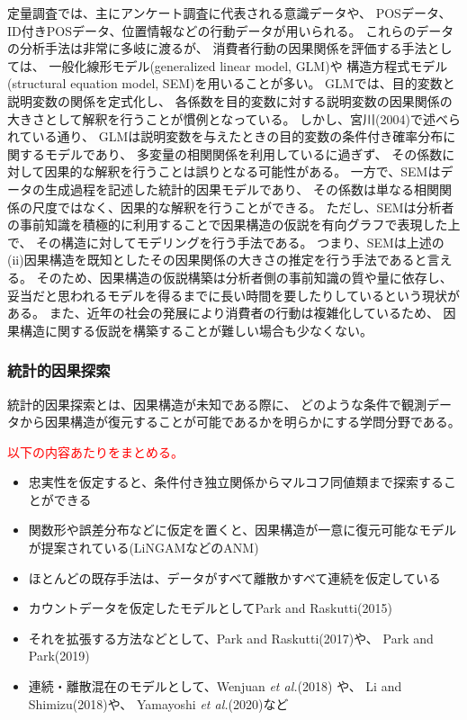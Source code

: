 定量調査では、主にアンケート調査に代表される意識データや、
POSデータ、ID付きPOSデータ、位置情報などの行動データが用いられる。
これらのデータの分析手法は非常に多岐に渡るが、
消費者行動の因果関係を評価する手法としては、
一般化線形モデル(generalized linear model, GLM)や
構造方程式モデル(structural equation model, SEM)を用いることが多い。
GLMでは、目的変数と説明変数の関係を定式化し、
各係数を目的変数に対する説明変数の因果関係の大きさとして解釈を行うことが慣例となっている。
しかし、宮川(2004)\cite{2004-qj}で述べられている通り、
GLMは説明変数を与えたときの目的変数の条件付き確率分布に関するモデルであり、
多変量の相関関係を利用しているに過ぎず、
その係数に対して因果的な解釈を行うことは誤りとなる可能性がある。
一方で、SEMはデータの生成過程を記述した統計的因果モデルであり、
その係数は単なる相関関係の尺度ではなく、因果的な解釈を行うことができる\cite{2004-qj}。
ただし、SEMは分析者の事前知識を積極的に利用することで因果構造の仮説を有向グラフで表現した上で、
その構造に対してモデリングを行う手法である。
つまり、SEMは上述の(ii)因果構造を既知としたその因果関係の大きさの推定を行う手法であると言える。
そのため、因果構造の仮説構築は分析者側の事前知識の質や量に依存し、
妥当だと思われるモデルを得るまでに長い時間を要したりしているという現状がある。
また、近年の社会の発展により消費者の行動は複雑化しているため、
因果構造に関する仮説を構築することが難しい場合も少なくない。


\subsubsection{統計的因果探索}

統計的因果探索とは、因果構造が未知である際に、
どのような条件で観測データから因果構造が復元することが可能であるかを明らかにする学問分野である。

\textcolor{red}{以下の内容あたりをまとめる。}
\begin{itemize}
  \item 忠実性を仮定すると、条件付き独立関係からマルコフ同値類まで探索することができる
  \item 関数形や誤差分布などに仮定を置くと、因果構造が一意に復元可能なモデルが提案されている(LiNGAMなどのANM)
  \item ほとんどの既存手法は、データがすべて離散かすべて連続を仮定している
  \item カウントデータを仮定したモデルとしてPark and Raskutti(2015)\cite{Park2015-tj}
  \item それを拡張する方法などとして、Park and Raskutti(2017)\cite{Park2017-hw}や、
        Park and Park(2019)\cite{Park2019-qy}
  \item 連続・離散混在のモデルとして、Wenjuan \textit{et al.}(2018)\cite{Wenjuan2018-nm} や、
        Li and Shimizu(2018)\cite{Li2018-aw}や、
        Yamayoshi \textit{et al.}(2020)\cite{Yamayoshi2020-gu}など
\end{itemize}
